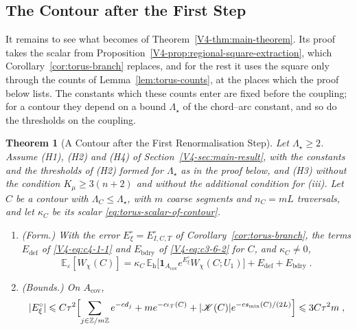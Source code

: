 \documentclass[11pt]{article}
\numberwithin{equation}{section}
\newtheorem{theorem}{Theorem}[section]
\theoremstyle{remark}
\theoremstyle{plain}
\begin{document}
\subsection{The Contour after the First Step}\label{sec:torus-theorem}

It remains to see what becomes of Theorem~\ref{V4-thm:main-theorem}. Its proof takes the scalar from Proposition~\ref{V4-prop:regional-square-extraction}, which Corollary~\ref{cor:torus-branch} replaces, and for the rest it uses the square only through the counts of Lemma~\ref{lem:torus-counts}, at the places which the proof below lists. The constants which these counts enter are fixed before the coupling; for a contour they depend on a bound $\Lambda_{\star}$ of the chord--arc constant, and so do the thresholds on the coupling.

\begin{theorem}[A Contour after the First Renormalisation Step]\label{thm:torus-contour-theorem}
Let $\Lambda_{\star}\geqslant 2$. Assume (H1), (H2) and (H4) of Section~\ref{V4-sec:main-result}, with the constants and the thresholds of (H2) formed for $\Lambda_{\star}$ as in the proof below, and (H3) without the condition $K_{\mu}\geqslant 3(n+2)$ and without the additional condition for (iii). Let $C$ be a contour with $\Lambda_C\leqslant \Lambda_{\star}$, with $m$ coarse segments and $n_C= mL$ traversals, and let $\kappa_C$ be its scalar \eqref{eq:torus-scalar-of-contour}.
\begin{enumerate}[label=(\roman*)]
    \item (Form.) With the error $E^{\circ}_{\xi}= E^{\circ}_{I,C,T}$ of Corollary~\ref{cor:torus-branch}, the terms $E_{\mathrm{def}}$ of \eqref{V4-eq:c4-1-1} and $E_{\mathrm{bdry}}$ of \eqref{V4-eq:c3-6-2} for $C$, and $\kappa_C\neq0$,
    \begin{equation}\label{eq:torus-theorem-identity}
        \mathbb E_{\varepsilon}[W_{\chi}(C)]=\kappa_C\,\mathbb E_{\mathrm h}\bigl[\mathbf 1_{A_{\mathrm{cov}}}e^{E^{\circ}_{\xi}}W_{\chi}(C;U_1)\bigr]+E_{\mathrm{def}}+E_{\mathrm{bdry}}\;.
    \end{equation}
    \item (Bounds.) On $A_{\mathrm{cov}}$,
    \begin{equation}\label{eq:torus-theorem-bounds}
        \begin{gathered}
            | E^{\circ}_{\xi}|\leqslant C\tau^2\Bigl[\sum_{j\in\mathbb Z/m\mathbb Z}e^{-cd_j}+me^{-c\iota_T(C)}+|\mathscr K(C)|e^{-cs_{\min}(C)/(2L)}\Bigr]\leqslant 3C\tau^2m\;,\\

\end{gathered}
\end{equation}
\end{enumerate}
\end{theorem}
\end{document}
